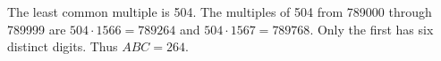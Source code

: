 The least common multiple is 504. The multiples of 504 from 789000 through 789999 are $ 504\cdot1566=789264 $ and $ 504\cdot1567=789768 $. Only the first has six distinct digits. Thus $\boxed{ABC=264}$.
